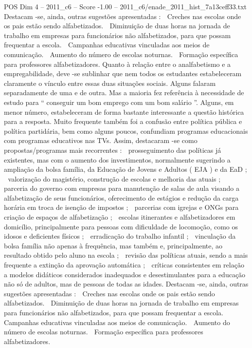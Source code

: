 \begin{textsample}{POS Dim 4 – 2011\_c6 – Score -1.00 – 2011\_c6/enade\_2011\_hist\_7a13ceff33.txt}
Destacam -se, ainda, outras sugestões apresentadas :  Creches nas escolas onde os pais estão sendo alfabetizados.  Diminuição de duas horas na jornada de trabalho em empresas para funcionários não alfabetizados, para que possam frequentar a escola.  Campanhas educativas vinculadas aos meios de comunicação.  Aumento do número de escolas noturnas.  Formação específica para professores alfabetizadores.
Quanto à relação entre o analfabetismo e a empregabilidade, deve -se sublinhar que nem todos os estudantes estabeleceram claramente o vínculo entre essas duas situações sociais.
Alguns falaram separadamente de uma e de outra.
Mas a maioria fez referência à necessidade de estudo para “ conseguir um bom emprego com um bom salário ”.
Alguns, em menor número, estabeleceram de forma bastante interessante a questão histórica para a resposta.
Muito frequente também foi a confusão entre política pública e política partidária, bem como alguns poucos, confundiam programas educacionais com programas educativos nas TVs.
Assim, destacaram -se como propostas/programas mais recorrentes :  prosseguimento das políticas já existentes, mas com o aumento dos investimentos, normalmente sugerindo a ampliação da bolsa família, da Educação de Jovens e Adultos ( EJA ) e da EaD ;  valorização do magistério, construção de escolas e melhoria das atuais ;  parceria do governo com empresas para manutenção de salas de aula visando a alfabetização de seus funcionários, oferecimento de estágios e redução da carga horária em troca de isenção de impostos ;  parcerias com igrejas e ONGs para criação de espaços de alfabetização ;  escolas itinerantes e alfabetizadores em domicílio, principalmente para pessoas com dificuldade de locomoção, como os idosos e deficientes físicos ;  erradicação do trabalho infantil ;  vinculação da bolsa família não apenas à frequência, mas também e, principalmente, ao resultado obtido pelo aluno na escola ;  revisão das políticas atuais, sendo a mais frequente a extinção da aprovação automática ;  críticas consistentes em relação a modelos didáticos considerados inadequados e desestimulantes para a educação não só de adultos, mas de pessoas de todas as idades.
Destacam -se, ainda, outras sugestões apresentadas :  Creches nas escolas onde os pais estão sendo alfabetizados.  Diminuição de duas horas na jornada de trabalho em empresas para funcionários não alfabetizados, para que possam frequentar a escola.  Campanhas educativas vinculadas aos meios de comunicação.  Aumento do número de escolas noturnas.  Formação específica para professores alfabetizadores.

\end{textsample}
